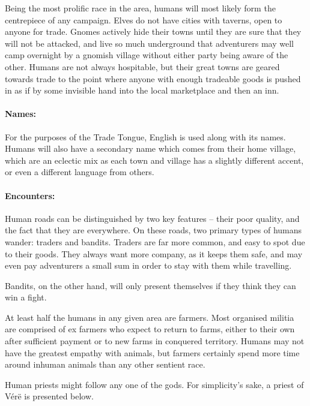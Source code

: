 \begin{multicols}{2}
Being the most prolific race in the area, humans will most likely form the centrepiece of any campaign.  Elves do not have cities with taverns, open to anyone for trade.  Gnomes actively hide their towns until they are sure that they will not be attacked, and live so much underground that adventurers may well camp overnight by a gnomish village without either party being aware of the other.  Humans are not always hospitable, but their great towns are geared towards trade to the point where anyone with enough tradeable goods is pushed in as if by some invisible hand into the local marketplace and then an inn.

\paragraph{Names:} For the purposes of the Trade Tongue, English is used along with its names.
Humans will also have a secondary name which comes from their home village, which are an eclectic mix as each town and village has a slightly different accent, or even a different language from others.

\paragraph{Encounters:} Human roads can be distinguished by two key features -- their poor quality, and the fact that they are everywhere.
On these roads, two primary types of humans wander: traders and bandits.
Traders are far more common, and easy to spot due to their goods.
They always want more company, as it keeps them safe, and may even pay adventurers a small sum in order to stay with them while travelling.

Bandits, on the other hand, will only present themselves if they think they can win a fight.

\label{human_trader}

At least half the humans in any given area are farmers.
Most organised militia are comprised of ex farmers who expect to return to farms, either to their own after sufficient payment or to new farms in conquered territory.
Humans may not have the greatest empathy with animals, but farmers certainly spend more time around inhuman animals than any other sentient race.


\label{human_priest}

Human priests might follow any one of the gods.
For simplicity's sake, a priest of V\'{e}r\"{e} is presented below.


\end{multicols}
